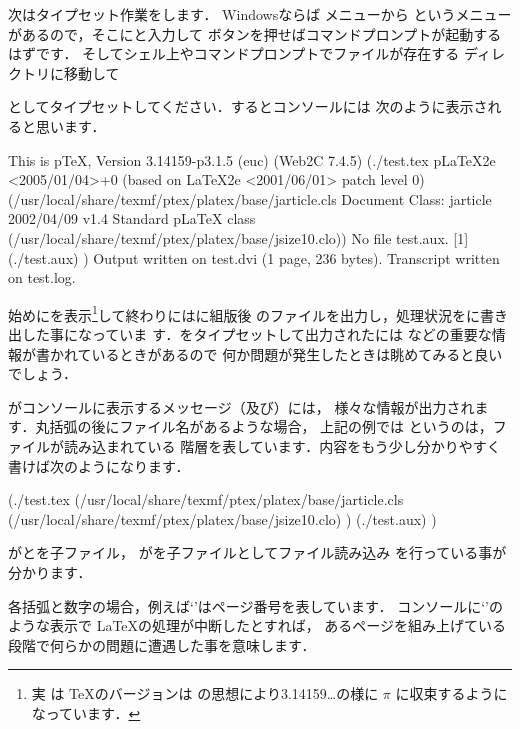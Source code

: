 %
次はタイプセット作業をします．
Windowsならば  メニューから  
というメニューがあるので，そこにと入力して
ボタンを押せばコマンドプロンプトが起動するはずです．
そしてシェル上やコマンドプロンプトでファイルが存在する
ディレクトリに移動して
\begin{InTerm}
\end{InTerm}
として{タイプセット}してください．するとコンソールには
次のように表示されると思います．

\begin{OutTerm}
This is pTeX, Version 3.14159-p3.1.5 (euc) (Web2C 7.4.5)
(./test.tex
pLaTeX2e <2005/01/04>+0 (based on LaTeX2e <2001/06/01> patch level 0)
(/usr/local/share/texmf/ptex/platex/base/jarticle.cls
Document Class: jarticle 2002/04/09 v1.4 Standard pLaTeX class
(/usr/local/share/texmf/ptex/platex/base/jsize10.clo))
No file test.aux.
[1] (./test.aux) )
Output written on test.dvi (1 page, 236 bytes).
Transcript written on test.log.
\end{OutTerm}

始めにを表示\footnote{実
は \TeX のバージョンは  の思想により3.14159\ldots の様に
$\pi$ に収束するようになっています．}して終わりにはに組版後
のファイルを出力し，処理状況をに書き出した事になっていま
す．をタイプセットして出力されたには
などの重要な情報が書かれているときがあるので
何か問題が発生したときは眺めてみると良いでしょう．

\begin{Trick}
\laTEX がコンソールに表示するメッセージ（及び）には，
様々な情報が出力されます．丸括弧の後にファイル名があるような場合，
上記の例では  というのは，ファイルが読み込まれている
階層を表しています．内容をもう少し分かりやすく書けば次のようになります．

\begin{InText}
 (./test.tex
   (/usr/local/share/texmf/ptex/platex/base/jarticle.cls
      (/usr/local/share/texmf/ptex/platex/base/jsize10.clo)
   )
   (./test.aux) 
 )
\end{InText}

%
がとを子ファイル，
がを子ファイルとしてファイル読み込み
を行っている事が分かります．

各括弧と数字の場合，例えば`\str{[1]}'はページ番号を表しています．
コンソールに`\str{[}'のような表示で \LaTeX の処理が中断したとすれば，
あるページを組み上げている段階で何らかの問題に遭遇した事を意味します．
\end{Trick}

